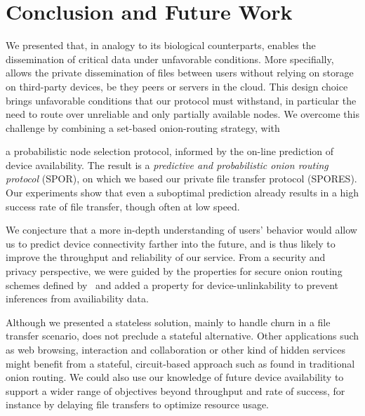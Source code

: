 \section{Conclusion and Future Work}%
\label{conclusion}

We presented \name that, in analogy to its biological
counterparts, enables the dissemination of critical data under unfavorable conditions. More
specifially, \name allows the private dissemination of files between users without relying on
storage on third-party devices, be they peers or servers in the
cloud. This design choice brings unfavorable conditions that our protocol must withstand, in particular the need to route over unreliable and only partially available nodes. We overcome this challenge by combining a set-based onion-routing strategy, with {a probabilistic node selection protocol, informed by the on-line prediction of device availability. The result is a \emph{predictive and probabilistic onion routing protocol} (\ac{SPOR}), on which we based our private file transfer protocol (\ac{SPORES}). Our experiments show that even a suboptimal prediction
already results in a high success rate of file transfer,
though often at low speed.

We conjecture that a more in-depth understanding of users'
behavior would allow us to predict device connectivity farther into
the future, and is thus likely to improve the throughput and reliability of our service. From a security and
privacy perspective, we were guided by the properties for secure onion
routing schemes defined by~\cite{CLOnionRouting} and added a property
for device-unlinkability to prevent inferences from availiability data.

Although we presented a stateless solution, mainly to handle churn in
a file transfer scenario, \name does not preclude a stateful alternative. 
Other applications such as web browsing, interaction and
collaboration or other kind of hidden services might benefit from a stateful, circuit-based approach
such as found in traditional onion routing. We could also use our knowledge of future device availability to support a wider range of objectives beyond throughput and rate of success, for instance by delaying
file transfers to optimize resource usage. 

}
